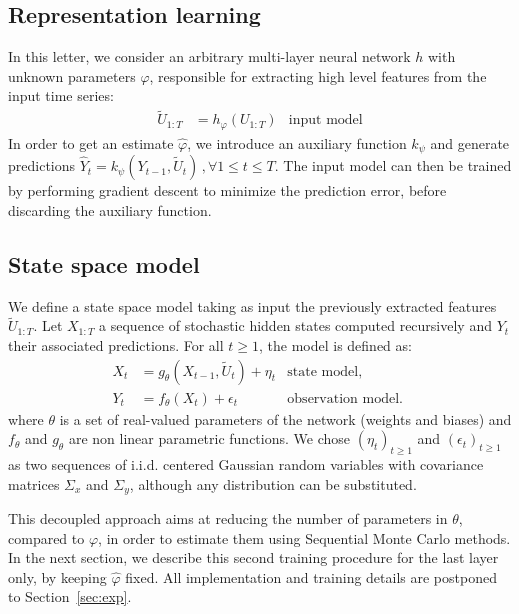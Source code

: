 \documentclass[journal]{IEEEtran}
\begin{document}
\subsection{Representation learning}%
In this letter, we consider an arbitrary multi-layer neural network $h$ with unknown parameters $\varphi$, responsible for extracting high level features from the input time series:
\begin{align}
	\widetilde U_{1:T} & = h_\varphi(U_{1:T})& \text{input model}
\end{align}
In order to get an estimate $\hat \varphi$, we introduce an auxiliary function $k_\psi$ and generate predictions $\hat Y_t = k_\psi(Y_{t-1}, \widetilde U_t)\,, \forall 1 \leq t \leq T$.
The input model can then be trained by performing gradient descent to minimize the prediction error, before discarding the auxiliary function.

\subsection{State space model}
\label{sub:proposed_architecture}
We define a state space model taking as input the previously extracted features $\widetilde U_{1:T}$.
Let $X_{1:T}$ a sequence of stochastic hidden states computed recursively and $Y_t$ their associated predictions.
For all $t \geq 1$, the model is defined as:
\begin{align}
	X_t            & = g_\theta(X_{t-1}, \widetilde U_t) + \eta_t & \text{state model, }       \\
	Y_t            & = f_\theta(X_t) + \epsilon_t                 & \text{observation model. }
\end{align}
where $\theta$ is a set of real-valued parameters of the network (weights and biases) and $f_\theta$ and $g_\theta$ are non linear parametric functions.
We chose $(\eta_t)_{t\geq 1}$ and $(\epsilon_t)_{t\geq 1}$ as two sequences of i.i.d. centered Gaussian random variables with covariance matrices $\Sigma_x$ and $\Sigma_y$, although any distribution can be substituted.

This decoupled approach aims at reducing the number of parameters in $\theta$, compared to $\varphi$, in order to estimate them using Sequential Monte Carlo methods.
In the next section, we describe this second training procedure for the last layer only, by keeping $\hat \varphi$ fixed.
All implementation and training details are postponed to Section~\ref{sec:exp}.
\end{document}
